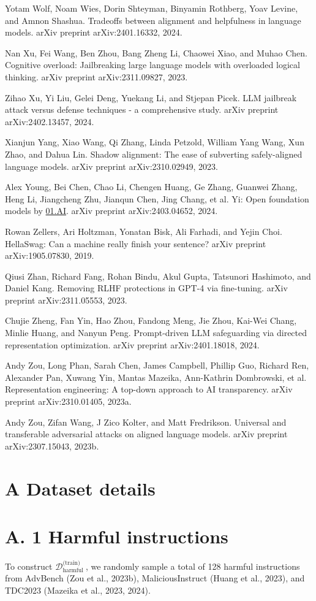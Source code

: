 \documentclass[10pt]{article}
\begin{document}
Yotam Wolf, Noam Wies, Dorin Shteyman, Binyamin Rothberg, Yoav Levine, and Amnon Shashua. Tradeoffs between alignment and helpfulness in language models. arXiv preprint arXiv:2401.16332, 2024.

Nan Xu, Fei Wang, Ben Zhou, Bang Zheng Li, Chaowei Xiao, and Muhao Chen. Cognitive overload: Jailbreaking large language models with overloaded logical thinking. arXiv preprint arXiv:2311.09827, 2023.

Zihao Xu, Yi Liu, Gelei Deng, Yuekang Li, and Stjepan Picek. LLM jailbreak attack versus defense techniques - a comprehensive study. arXiv preprint arXiv:2402.13457, 2024.

Xianjun Yang, Xiao Wang, Qi Zhang, Linda Petzold, William Yang Wang, Xun Zhao, and Dahua Lin. Shadow alignment: The ease of subverting safely-aligned language models. arXiv preprint arXiv:2310.02949, 2023.

Alex Young, Bei Chen, Chao Li, Chengen Huang, Ge Zhang, Guanwei Zhang, Heng Li, Jiangcheng Zhu, Jianqun Chen, Jing Chang, et al. Yi: Open foundation models by \href{http://01.AI}{01.AI}. arXiv preprint arXiv:2403.04652, 2024.

Rowan Zellers, Ari Holtzman, Yonatan Bisk, Ali Farhadi, and Yejin Choi. HellaSwag: Can a machine really finish your sentence? arXiv preprint arXiv:1905.07830, 2019.

Qiusi Zhan, Richard Fang, Rohan Bindu, Akul Gupta, Tatsunori Hashimoto, and Daniel Kang. Removing RLHF protections in GPT-4 via fine-tuning. arXiv preprint arXiv:2311.05553, 2023.

Chujie Zheng, Fan Yin, Hao Zhou, Fandong Meng, Jie Zhou, Kai-Wei Chang, Minlie Huang, and Nanyun Peng. Prompt-driven LLM safeguarding via directed representation optimization. arXiv preprint arXiv:2401.18018, 2024.

Andy Zou, Long Phan, Sarah Chen, James Campbell, Phillip Guo, Richard Ren, Alexander Pan, Xuwang Yin, Mantas Mazeika, Ann-Kathrin Dombrowski, et al. Representation engineering: A top-down approach to AI transparency. arXiv preprint arXiv:2310.01405, 2023a.

Andy Zou, Zifan Wang, J Zico Kolter, and Matt Fredrikson. Universal and transferable adversarial attacks on aligned language models. arXiv preprint arXiv:2307.15043, 2023b.

\section*{A Dataset details}
\section*{A. 1 Harmful instructions}
To construct $\mathcal{D}_{\text {harmful }}^{\text {(train) }}$, we randomly sample a total of 128 harmful instructions from AdvBench (Zou et al., 2023b), MaliciousInstruct (Huang et al., 2023), and TDC2023 (Mazeika et al., 2023, 2024).
\end{document}
